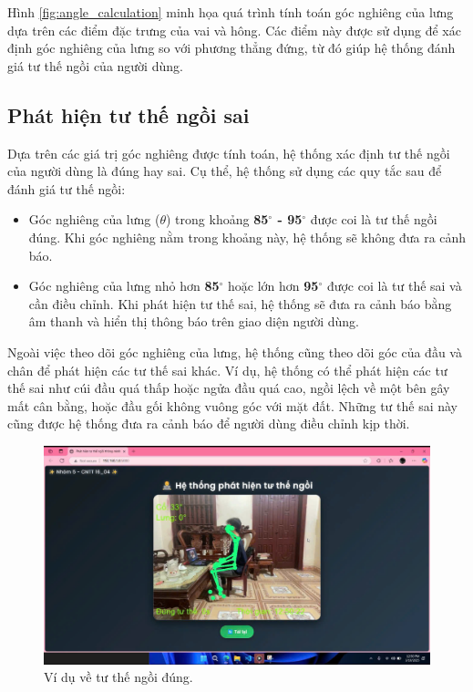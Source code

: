 \documentclass[conference]{IEEEtran}
\begin{document}
Hình \ref{fig:angle_calculation} minh họa quá trình tính toán góc nghiêng của lưng dựa trên các điểm đặc trưng của vai và hông. Các điểm này được sử dụng để xác định góc nghiêng của lưng so với phương thẳng đứng, từ đó giúp hệ thống đánh giá tư thế ngồi của người dùng.

\subsection{Phát hiện tư thế ngồi sai}
Dựa trên các giá trị góc nghiêng được tính toán, hệ thống xác định tư thế ngồi của người dùng là đúng hay sai. Cụ thể, hệ thống sử dụng các quy tắc sau để đánh giá tư thế ngồi:

\begin{itemize}
    \item Góc nghiêng của lưng (\(\theta\)) trong khoảng \textbf{85$^\circ$ - 95$^\circ$} được coi là tư thế ngồi đúng. Khi góc nghiêng nằm trong khoảng này, hệ thống sẽ không đưa ra cảnh báo.
    \item Góc nghiêng của lưng nhỏ hơn \textbf{85$^\circ$} hoặc lớn hơn \textbf{95$^\circ$} được coi là tư thế sai và cần điều chỉnh. Khi phát hiện tư thế sai, hệ thống sẽ đưa ra cảnh báo bằng âm thanh và hiển thị thông báo trên giao diện người dùng.
\end{itemize}

Ngoài việc theo dõi góc nghiêng của lưng, hệ thống cũng theo dõi góc của đầu và chân để phát hiện các tư thế sai khác. Ví dụ, hệ thống có thể phát hiện các tư thế sai như cúi đầu quá thấp hoặc ngửa đầu quá cao, ngồi lệch về một bên gây mất cân bằng, hoặc đầu gối không vuông góc với mặt đất. Những tư thế sai này cũng được hệ thống đưa ra cảnh báo để người dùng điều chỉnh kịp thời.

\begin{figure}[H]
    \centering
    \includegraphics[width=0.9\linewidth]{images/sitting_posture_correct.png}
    \caption{Ví dụ về tư thế ngồi đúng.}
    \label{fig:sitting_posture_correct}
\end{figure}
\end{document}
